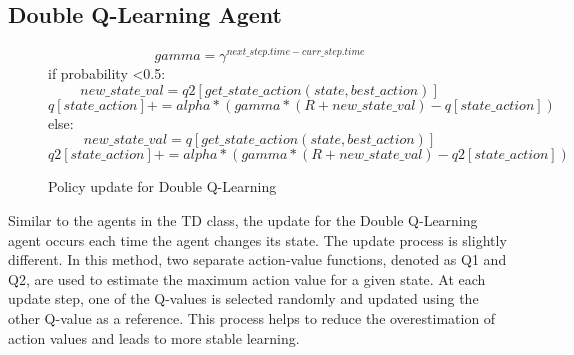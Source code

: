 \subsection{Double Q-Learning Agent}
\begin{figure}[h]
	\raggedright
 	$$ gamma = \gamma^{next\_step.time - curr\_step.time} $$
    if probability \textless 0.5:
   	$$ new\_state\_val = q2[get\_state\_action(state,best\_action)] $$ 
    $$ q[state\_action] += alpha * (gamma * (R + new\_state\_val) - q[state\_action]) $$ 
    else:
    $$ new\_state\_val = q[get\_state\_action(state,best\_action)] $$ 
    $$ q2[state\_action] += alpha * (gamma * (R + new\_state\_val) - q2[state\_action]) $$ 
    \caption{Policy update for Double Q-Learning}
    \label{dqlUpdate}
\end{figure}
Similar to the agents in the TD class, the update for the Double Q-Learning agent occurs each time the agent changes its state. The update process is slightly different. In this method, two separate action-value functions, denoted as Q1 and Q2, are used to estimate the maximum action value for a given state. At each update step, one of the Q-values is selected randomly and updated using the other Q-value as a reference. This process helps to reduce the overestimation of action values and leads to more stable learning.